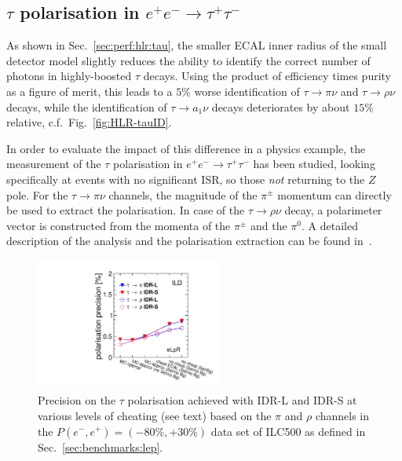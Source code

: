 \subsection{\texorpdfstring{$\tau$}{Tau} polarisation \texorpdfstring{in $e^+e^- \to \tau^+\tau^-$}{in e+e- -> tau tau}}

As shown in Sec.~\ref{sec:perf:hlr:tau}, the smaller ECAL inner radius of the small detector model slightly reduces the ability to identify the correct number of photons in
highly-boosted $\tau$ decays. Using the product of efficiency times purity as a figure of merit, this leads to a $5\%$ worse identification of $\tau \to \pi \nu$ and $\tau \to \rho \nu$ decays, while the identification of $\tau \to a_1 \nu$ decays deteriorates by about $15\%$ relative, c.f.\ Fig.~\ref{fig:HLR-tauID}. 

In order to evaluate the impact of this difference in a physics example, the measurement of the $\tau$ polarisation in $e^+e^- \to \tau^+\tau^-$ has been studied, looking specifically at events with no significant ISR, so those {\em not} returning to the $Z$ pole. For the $\tau \to \pi \nu$ channels, the magnitude of the $\pi^{\pm}$ momentum can directly be used to extract the polarisation. In case of the $\tau \to \rho \nu$ decay, a polarimeter vector is constructed from the momenta of the $\pi^{\pm}$ and the $\pi^0$. A detailed description of the analysis and the polarisation extraction can be found in~\cite{ILDNote:tautau}.

\begin{figure}[htbp]
\begin{center}
 \includegraphics[width=0.55\textwidth]{Performance/fig/drawpexpresults0.pdf}
\end{center}
\caption{Precision on the $\tau$ polarisation achieved with IDR-L and IDR-S at various levels of cheating (see text) based on the $\pi$ and $\rho$ channels in the $P(e^-,e^+)=(-80\%,+30\%)$ data set of ILC500 as defined in Sec.~\ref{sec:benchmarks:lep}.}
\label{fig:tautau:taupol}
\end{figure}

